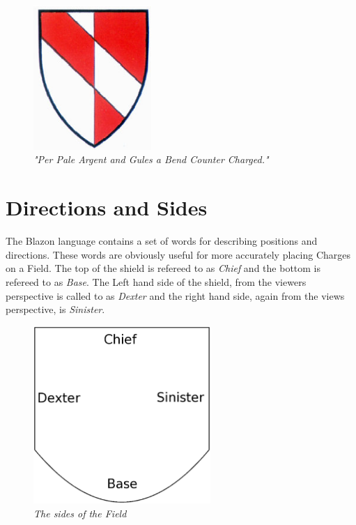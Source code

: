 \begin{figure}[H]
  \centering
    \includegraphics[width=0.4\textwidth]{blazon/images/countercharged.eps}
  \caption{\emph{"Per Pale Argent and Gules a Bend Counter Charged."\cite{countercharge}}}
  \label{fig:counter}
  
\end{figure}

\section{Directions and Sides}
The Blazon language contains a set of words for describing positions and directions.  These words are obviously useful for more accurately placing Charges on a Field.  The top of the shield is refereed to as \emph{Chief} and the bottom is refereed to as \emph{Base}.  The Left hand side of the shield, from the viewers perspective is called to as \emph{Dexter} and the right hand side, again from the views perspective, is \emph{Sinister}. 

\begin{figure}[H]
  \centering
    \includegraphics[width=0.6\textwidth]{blazon/images/sides.eps}
  \caption{\emph{The sides of the Field}}
  
\end{figure}

